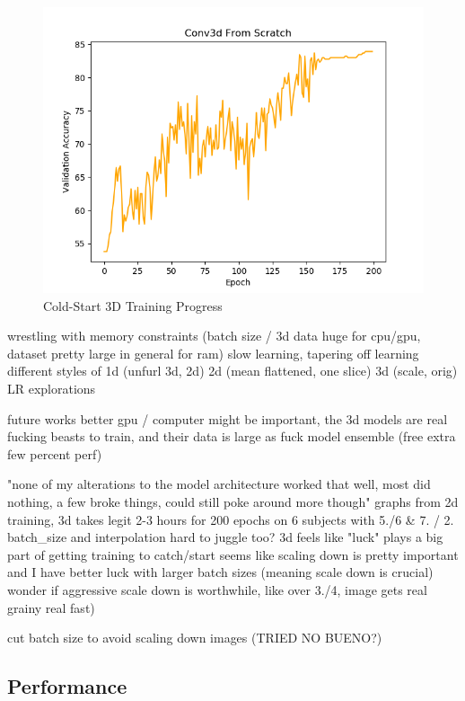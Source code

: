 \documentclass[10pt,twocolumn,letterpaper]{article}
\begin{document}
 \begin{figure}
  \includegraphics[width=\linewidth]{images/3d_cold.png}
  \caption{Cold-Start 3D Training Progress}
  \label{fig:3d_cold}
\end{figure}
wrestling with memory constraints (batch size / 3d data huge for cpu/gpu, dataset pretty large in general for ram) slow learning, tapering off learning
different styles of 1d (unfurl 3d, 2d) 2d (mean flattened, one slice) 3d (scale, orig)
LR explorations

future works
better gpu / computer might be important, the 3d models are real fucking beasts to train, and their data is large as fuck
model ensemble (free extra few percent perf)



"none of my alterations to the model architecture worked that well, most did nothing, a few broke things, could still poke around more though"
graphs from 2d training, 3d takes legit 2-3 hours for 200 epochs on 6 subjects with 5./6 & 7. / 2.
batch_size and interpolation hard to juggle too?
3d feels like "luck" plays a big part of getting training to catch/start
seems like scaling down is pretty important and I have better luck with larger batch sizes (meaning scale down is crucial) wonder if aggressive scale down is worthwhile, like over 3./4, image gets real grainy real fast)

cut batch size to avoid scaling down images (TRIED NO BUENO?)

\subsection{Performance}\label{subsec:performance}
\end{document}
